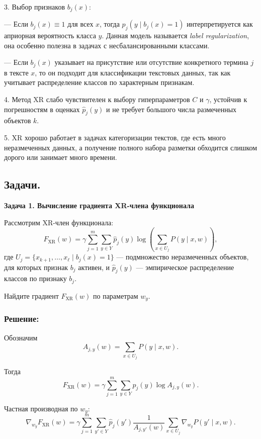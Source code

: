3. Выбор признаков $b_j(x)$:

--- Если $b_j(x) \equiv 1$ для всех $x$, тогда $p_j(y \mid b_j(x)=1)$ интерпретируется как априорная вероятность класса $y$. Данная модель называется \textit{label regularization}, она особенно полезна в задачах с несбалансированными классами.

--- Если $b_j(x)$ указывает на присутствие или отсутствие конкретного термина $j$ в тексте $x$, то он подходит для классификации текстовых данных, так как учитывает распределение классов по характерным признакам.

4. Метод XR слабо чувствителен к выбору гиперпараметров $C$ и $\gamma$, устойчив к погрешностям в оценках $\hat{p}_j(y)$ и не требует большого числа размеченных объектов $k$.

5. XR хорошо работает в задачах категоризации текстов, где есть много неразмеченных данных, а получение полного набора разметки обходится слишком дорого или занимает много времени.

\subsection{Задачи.}

\bigskip

\noindent\textbf{Задача 1. Вычисление градиента XR-члена функционала}

Рассмотрим XR-член функционала:
\[
F_{\text{XR}}(w) = \gamma \sum_{j=1}^m \sum_{y \in Y} \hat{p}_j(y) \log\left(\sum_{x \in U_j} P(y \mid x,w)\right),
\]
где $U_j = \{ x_{k+1}, \ldots, x_{\ell} \mid b_j(x)=1 \}$ — подмножество неразмеченных объектов, для которых признак $b_j$ активен, и $\hat{p}_j(y)$ — эмпирическое распределение классов по признаку $b_j$.

Найдите градиент $F_{\text{XR}}(w)$ по параметрам $w_y$.

\subsubsection*{Решение:}

Обозначим
\[
A_{j,y}(w) = \sum_{x \in U_j} P(y \mid x,w).
\]

Тогда
\[
F_{\text{XR}}(w) = \gamma \sum_{j=1}^m \sum_{y \in Y} \hat{p}_j(y) \log A_{j,y}(w).
\]

Частная производная по $w_y$:
\[
\nabla_{w_y} F_{\text{XR}}(w) = \gamma \sum_{j=1}^m \sum_{y' \in Y} \hat{p}_j(y') \frac{1}{A_{j,y'}(w)} \sum_{x \in U_j} \nabla_{w_y}P(y' \mid x,w).
\]

